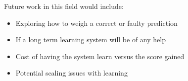Future work in this field would include:
\begin{itemize}
    \item Exploring how to weigh a correct or faulty prediction
    \item If a long term learning system will be of any help
    \item Cost of having the system learn versus the score gained
    \item Potential scaling issues with learning
\end{itemize}


